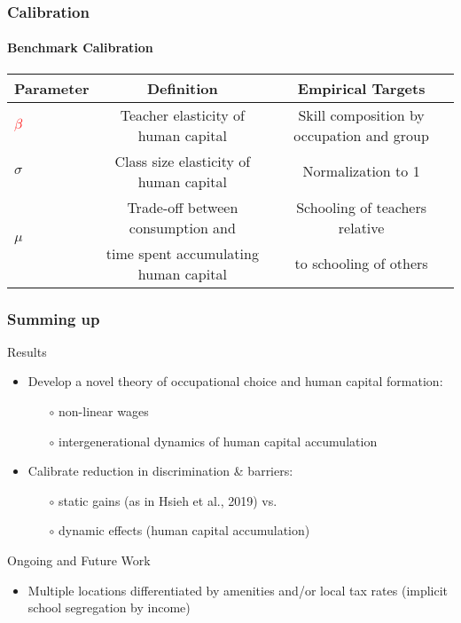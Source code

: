 \documentclass[11pt]{beamer}
\begin{document}
\begin{frame}
	\frametitle{Calibration}
	\framesubtitle{Benchmark Calibration}
	\tiny
	\begin{table}[h!]
		\centering
		\begin{tabular}{lcc}
			\toprule
			\toprule
			Parameter & Definition & Empirical Targets\\
			\midrule
			\textcolor{red}{$\beta$} & Teacher elasticity of human capital & Skill composition by occupation and group \\
			$\sigma$ & Class size elasticity of human capital & Normalization to 1\\
			\multirow{2}{*}{$\mu$} &  Trade-off between consumption and & Schooling of teachers relative\\
			& time spent accumulating human capital & to schooling of others\\
			\bottomrule
		\end{tabular}
		\label{tab:calibr}
	\end{table}
\end{frame}

	

\begin{frame}
	\frametitle{Summing up}
	\textcolor{tblue}{Results}
	\begin{itemize}
		\item Develop a novel theory of occupational choice and human capital formation: 
		\begin{itemize}
			\item[$\circ$] non-linear wages %
			\item[$\circ$] intergenerational dynamics of human capital accumulation
		\end{itemize}
		\item Calibrate reduction in discrimination \& barriers:
		\begin{itemize}
			\item[$\circ$] static gains (as in Hsieh et al., 2019) vs.
			\item[$\circ$] dynamic effects (human capital accumulation)
		\end{itemize}
	\end{itemize}
	\textcolor{tblue}{Ongoing and Future Work}
	\begin{itemize}				
		\item Multiple locations differentiated by amenities and/or local tax rates (implicit school segregation by income)
	\end{itemize}
\end{frame}
\end{document}
